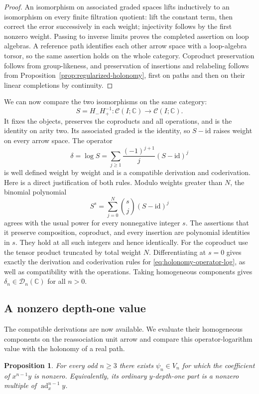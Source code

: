 \documentclass[11pt]{article}
\newcommand{\CC}{\mathbb C}
\DeclareMathOperator{\ad}{ad}
\newcommand{\id}{\mathrm{id}}
\newtheorem{proposition}[theorem]{Proposition}
\theoremstyle{definition}
\theoremstyle{remark}
\numberwithin{equation}{section}
\begin{document}
\begin{proof}
An isomorphism on associated graded spaces lifts inductively to an
isomorphism on every finite filtration quotient: lift the constant
term, then correct the error successively in each weight; injectivity
follows by the first nonzero weight.  Passing to inverse limits proves
the completed assertion on loop algebras.  A reference path identifies
each other arrow space with a loop-algebra torsor, so the same assertion
holds on the whole category.  Coproduct preservation follows from
group-likeness, and preservation of insertions and relabeling follows
from Proposition~\ref{prop:regularized-holonomy}, first on paths and
then on their linear completions by continuity.
\end{proof}

We can now compare the two isomorphisms on the same category:
\[
 S=H_-H_+^{-1}:\mathcal C(I;\CC)\longrightarrow\mathcal C(I;\CC).
\]
It fixes the objects, preserves the coproducts and all operations,
and is the identity on arity two.  Its associated graded is the
identity, so $S-\id$ raises weight on every arrow space.  The operator
\begin{equation}\label{eq:holonomy-operator-log}
 \delta=\log S=
 \sum_{j\geq1}\frac{(-1)^{j+1}}j(S-\id)^j
\end{equation}
is well defined weight by weight and is a compatible derivation and
coderivation.  Here is a direct justification of both rules.  Modulo
weights greater than $N$, the binomial polynomial
\[
 S^s=\sum_{j=0}^{N}\binom{s}{j}(S-\id)^j
\]
agrees with the usual power for every nonnegative integer $s$.
The assertions that it preserve composition, coproduct, and every
insertion are polynomial identities in $s$.  They hold at all such
integers and hence identically.  For the coproduct use the tensor
product truncated by total weight $N$.  Differentiating at $s=0$
gives exactly the derivation and coderivation rules for
\eqref{eq:holonomy-operator-log}, as well as compatibility with the
operations.  Taking homogeneous components gives
$\delta_n\in\mathcal D_n(\CC)$ for all $n>0$.

\subsection{A nonzero depth-one value}
The compatible derivations are now available.  We evaluate their
homogeneous components on the reassociation unit arrow and compare
this operator-logarithm value with the holonomy of a real path.

\begin{proposition}\label{prop:odd-depth-one}
For every odd $n\geq3$ there exists $\psi_n\in V_n$ for which the
coefficient of $x^{n-1}y$ is nonzero.  Equivalently, its ordinary
$y$-depth-one part is a nonzero multiple of $\ad_x^{n-1}y$.
\end{proposition}
\end{document}
